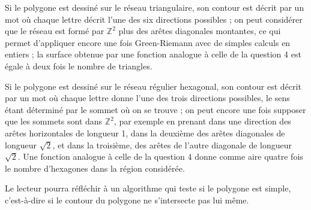 

\Q
Si le polygone est dessiné sur le réseau triangulaire, son contour est décrit par un mot où chaque lettre décrit l'une des six directions possibles ; on peut considérer que le réseau est formé par $\mathbb{Z}^2$ plus des arêtes diagonales montantes, ce qui permet d'appliquer encore une fois Green-Riemann avec de simples calculs en entiers ; la surface obtenue par une fonction analogue à celle de la question 4 est égale à deux fois le nombre de triangles.
\medskip

Si le polygone est dessiné sur le réseau régulier hexagonal, son contour est décrit par un mot où chaque lettre donne l'une des trois directions possibles, le sens étant déterminé par le sommet où on se trouve ; on peut encore une fois supposer que les sommets sont dans $\mathbb{Z}^2$, par exemple en prenant dans une direction des arêtes horizontales de longueur 1, dans la deuxième des arêtes diagonales de longueur $\sqrt{2}$, et dans la troisième, des arêtes de l'autre diagonale de longueur $\sqrt{2}$. Une fonction analogue à celle de la question 4 donne comme aire quatre fois le nombre d'hexagones dans la région considérée.
\newpage

Le lecteur pourra réfléchir à un algorithme qui teste si le polygone est simple, c'est-à-dire si le contour du polygone ne s'intersecte pas lui même.
\bigskip

\Fin
